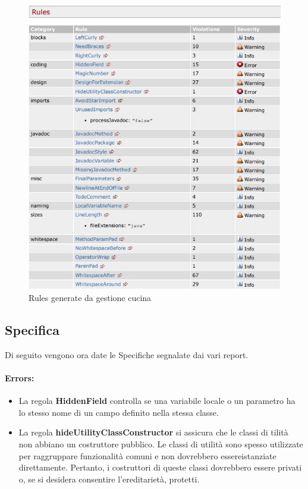 \begin{figure}[htbp]
	\centering
	\includegraphics[scale=0.9]{iterazione1/images/Cs_rules_Gestione_Cucina.jpg}
	\caption{Rules generate da gestione cucina\label{fig:Cs_Rules_Gestione_Cucina}}
\end{figure}


\newpage

\subsection{Specifica}
Di seguito vengono ora date le Specifiche segnalate dai vari report.

\paragraph{Errors:}

	\begin{itemize}

		\item La regola \textbf{\textbf{HiddenField}} controlla se una variabile locale o un parametro ha lo stesso nome di un campo  definito nella stessa classe.

		\item La regola \textbf{\textbf{hideUtilityClassConstructor}} si assicura che le classi di tilità non abbiano un costruttore pubblico. Le classi di utilità sono spesso utilizzate per raggruppare funzionalità comuni e non dovrebbero essereistanziate direttamente. Pertanto, i costruttori di queste classi dovrebbero essere privati o, se si desidera consentire l’ereditarietà, protetti.

	\end{itemize}

